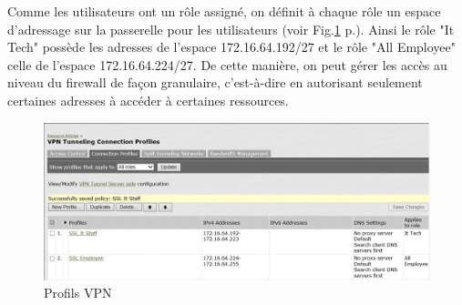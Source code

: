 Comme les utilisateurs ont un rôle assigné, on définit à chaque rôle un espace d'adressage sur la passerelle pour les utilisateurs (voir Fig.\ref{fig:profilVPN} p.\pageref{fig:profilVPN}).
Ainsi le rôle "It Tech" possède les adresses de l'espace 172.16.64.192/27 et le rôle "All Employee" celle de l'espace 172.16.64.224/27.
De cette manière, on peut gérer les accès au niveau du firewall de façon granulaire, c'est-à-dire en autorisant seulement certaines adresses à accéder à certaines ressources.
\begin{figure}[ht]
	\centering
	\includegraphics[width=16cm]{juniper/VPNProfiles.png}
	\caption{Profils VPN}
	\label{fig:profilVPN}
\end{figure}